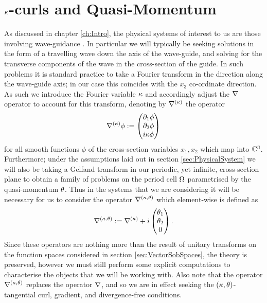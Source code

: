 \section{$\kappa$-curls and Quasi-Momentum} \label{sec:kCurlsAndQM}
As discussed in chapter \ref{ch:Intro}, the physical systems of interest to us are those involving wave-guidance .
In particular we will typically be seeking solutions in the form of a travelling wave down the axis of the wave-guide, and solving for the transverse components of the wave in the cross-section of the guide.
In such problems it is standard practice to take a Fourier transform in the direction along the wave-guide axis; in our case this coincides with the $x_3$ co-ordinate direction.
As such we introduce the Fourier variable $\kappa$ and accordingly adjust the $\nabla$ operator to account for this transform, denoting by $\nabla^{(\kappa)}$ the operator
\begin{align*}
	\nabla^{(\kappa)}\phi := \begin{pmatrix} \partial_1\phi \\ \partial_2\phi \\ i\kappa\phi\end{pmatrix}
\end{align*}
for all smooth functions $\phi$ of the cross-section variables $x_1,x_2$ which map into $\mathbb{C}^3$.
Furthermore; under the assumptions laid out in section \ref{sec:PhysicalSystem}  we will also be taking a Gelfand transform in our periodic, yet infinite, cross-section plane to obtain a family of problems on the period cell $\Omega$ parametrised by the quasi-momentum $\theta$.
Thus in the systems that we are considering it will be necessary for us to consider the operator $\nabla^{(\kappa, \theta)}$ which element-wise is defined as
\begin{align*}
	\nabla^{(\kappa, \theta)} := \nabla^{(\kappa)} + i\begin{pmatrix} \theta_1 \\ \theta_2 \\ 0 \end{pmatrix}.
\end{align*}
Since these operators are nothing more than the result of unitary transforms on the function spaces considered in section \ref{sec:VectorSobSpaces}, the theory is preserved, however we must still perform some explicit computations to characterise the objects that we will be working with.
Also note that the operator $\nabla^{(\kappa, \theta)}$ replaces the operator $\nabla$, and so we are in effect seeking the $\left( \kappa,\theta \right)$-tangential curl, gradient, and divergence-free conditions. \newline

